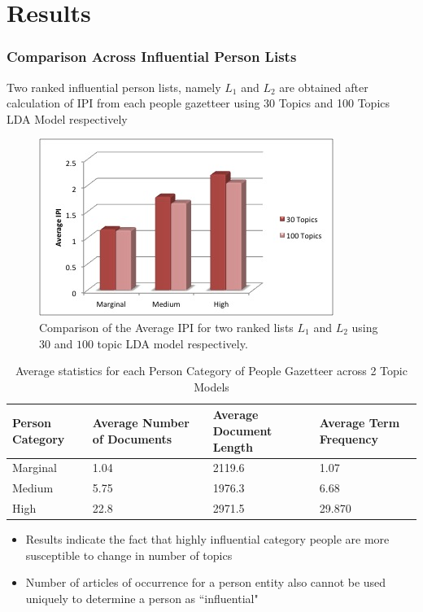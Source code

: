 \documentclass{beamer}
\begin{document}
\section{Results}
\begin{frame}[allowframebreaks]
\frametitle{Comparison Across Influential Person Lists}
Two ranked influential person lists, namely $L_1$ and $L_2$ are obtained after calculation of IPI from each people gazetteer using 30 Topics and 100 Topics LDA Model respectively
\begin{figure}[h]
\begin{center}
\includegraphics[scale=0.5]{IPIChart}
\end{center}
\caption{Comparison of the Average IPI for two ranked lists $L_1$ and $L_2$ using $30$ and $100$ topic LDA model respectively.}
\end{figure}


\begin{table}
\begin{center}
    \begin{tabular}{|p{2cm}|p{2cm}|p{2cm}|p{2cm}|}
    \hline
    \textbf{Person Category}   & \textbf{Average Number of Documents}   &  \textbf{Average Document Length}	&  \textbf{Average Term Frequency}	\\  \hline
Marginal  & 1.04 & 2119.6 & 1.07 	\\ \hline
Medium  & 5.75 & 1976.3 & 6.68  \\ \hline
High  & 22.8 & 2971.5 & 29.870	 \\	\hline 
  \end{tabular}
  \end{center}
    \caption {Average statistics for each Person Category of People Gazetteer across 2 Topic Models}
\end{table}
\begin{itemize}
\item
Results indicate the fact that highly influential category people are more susceptible to change in number of topics
\item
Number of articles of occurrence for a person entity also cannot be used uniquely to determine a person as ``influential"
\end{itemize}
\end{frame}
\end{document}
